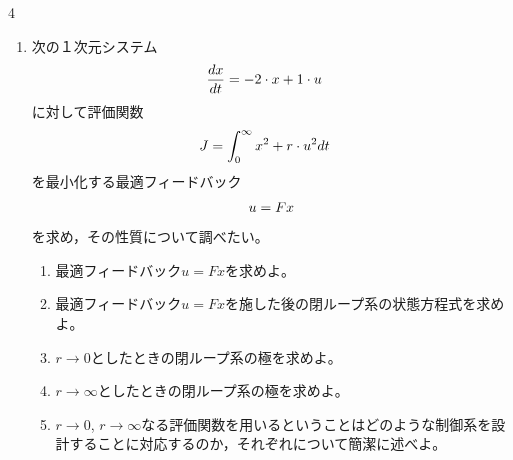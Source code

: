 \documentclass[fleqn]{article}
\begin{document}
\begin{multicols}{4}
\begin{enumerate}
\item
次の１次元システム
\vspace{-1mm}
\begin{align}
	\frac{dx}{dt} &= -2 \cdot x + 1 \cdot u
\nonumber
\vspace{-4mm}
\end{align}
に対して評価関数
\vspace{-1mm}
\begin{align}
	J &= \int_0^\infty  x^2 + r \cdot u^2 dt
\nonumber
\vspace{-4mm}
\end{align}
を最小化する最適フィードバック
\vspace{-1mm}
\begin{align}
	u=Fx
\nonumber
\vspace{-4mm}
\end{align}
を求め，その性質について調べたい。
\vspace{-2mm}

\begin{enumerate}

\item
最適フィードバック$u=Fx$を求めよ。
\vspace{20cm}

\vfill\null
\columnbreak

\item
最適フィードバック$u=Fx$を施した後の閉ループ系の状態方程式を求めよ。
\vspace{6cm}


\item
$r \rightarrow 0$としたときの閉ループ系の極を求めよ。
\vspace{3cm}

\item
$r \rightarrow \infty$としたときの閉ループ系の極を求めよ。
\vspace{3cm}

\item
$r \rightarrow 0$, $r \rightarrow \infty$なる評価関数を用いるということはどのような制御系を設計することに対応するのか，それぞれについて簡潔に述べよ。
\vspace{4cm}

\end{enumerate}




\end{enumerate}
\end{multicols}
\end{document}
